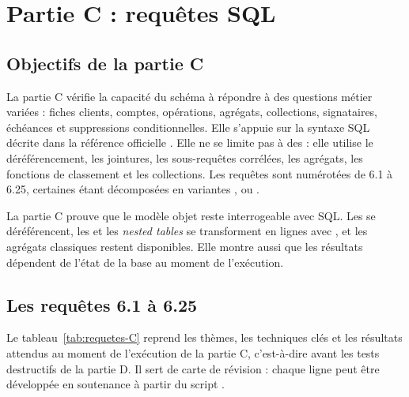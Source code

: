 \chapter{Partie C : requêtes SQL}
\label{chap:partieC}

\section{Objectifs de la partie C}

La partie C vérifie la capacité du schéma à répondre à des questions métier
variées : fiches clients, comptes, opérations, agrégats, collections,
signataires, échéances et suppressions conditionnelles. Elle s'appuie sur la
syntaxe SQL décrite dans la référence officielle \cite{oracleSQLRef}. Elle ne se limite pas à
des  : elle utilise le déréférencement, les jointures, les
sous-requêtes corrélées, les agrégats, les fonctions de classement et les
collections. Les requêtes sont numérotées de 6.1 à 6.25, certaines étant
décomposées en variantes ,  ou .

\begin{objectifbox}
La partie C prouve que le modèle objet reste interrogeable avec SQL. Les
 se déréférencent, les  et les \emph{nested tables} se
transforment en lignes avec , et les agrégats classiques
restent disponibles. Elle montre aussi que les résultats dépendent de l'état de
la base au moment de l'exécution.
\end{objectifbox}

\section{Les requêtes 6.1 à 6.25}

Le tableau~\ref{tab:requetes-C} reprend les thèmes, les techniques clés et les
résultats attendus au moment de l'exécution de la partie C, c'est-à-dire avant
les tests destructifs de la partie D. Il sert de carte de révision : chaque
ligne peut être développée en soutenance à partir du script
.

